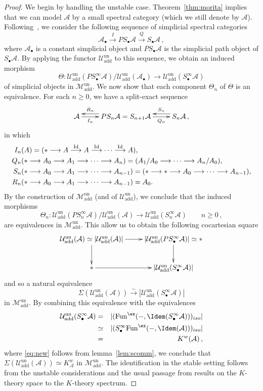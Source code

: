 \documentclass{amsart}
\newcommand{\ssdot}{\bullet}%
\newcommand{\subdot}{_\ssdot}
\newcommand{\Sdot}[1][\ssdot]{S_{#1}}
\newcommand{\iSdot}[1][\ssdot]{S^{\infty}_{#1}}
\renewcommand{\to}{\mathchoice{\longrightarrow}{\rightarrow}{\rightarrow}{\rightarrow}}
\newcommand{\cA}{{\mathcal A}}
\newcommand{\cM}{{\mathcal M}}
\newcommand{\cU}{{\mathcal U}}
\let\catsymbfont\mathcal
\newcommand{\aA}{{\catsymbfont{A}}}
\newcommand{\idemfun}{\Fun^{\ex}}
\newcommand{\Fun}{\mathrm{Fun}} %
\newcommand{\too}{\longrightarrow}%
\newcommand{\Motaddun}{\cM_{\mathrm{add}}^{\mathrm{un}}}
\newcommand{\Umotun}{\cU_{\mathrm{add}}^{\mathrm{un}}}
\numberwithin{equation}{section}
\theoremstyle{definition}
\begin{document}
\begin{proof}
We begin by handling the unstable case.  Theorem~\ref{thm:morita}
implies that we can model $\cA$ by a small spectral category (which we
still denote by $\cA$).
Following~\cite[3.3]{McCarthy}, we consider the following
sequence of simplicial spectral categories
\[
\cA\subdot \stackrel{I}{\too} P\Sdot\cA \stackrel{Q}{\too} \Sdot\cA \,,
\]
where $\cA\subdot$ is a constant simplicial object and $P\Sdot\cA$ is
the simplicial path object of $\Sdot \cA$. By applying the functor
$\Umotun$ to this sequence, we obtain an induced morphism
\[
\Theta\colon\Umotun(P\iSdot\cA)/\Umotun(\cA\subdot) \too
\Umotun(\iSdot\cA)
\]
of simplicial objects in $\Motaddun$. We now show that each component $\Theta_n$ of $\Theta$ is an equivalence. For each $n \geq 0$, we have a split-exact sequence
\[
\xymatrix{
\cA \ar[r]_-{I_n} & PS_n\cA=S_{n+1}\cA \ar@<-1ex>[l]_-{R_n}
\ar[r]_-{Q_n} & S_n\cA \ar@<-1ex>[l]_-{S_n} \,,
}
\]
in which
\begin{align*}
I_n&(A)=(\ast \to A \stackrel{\mathrm{Id}}{\to} A \stackrel{\mathrm{Id}}{\to}
\cdots \stackrel{\mathrm{Id}}{\to} A),\\
Q_n&(\ast \to A_0 \to A_1 \to \cdots \to A_n)=(A_1/A_0 \to \cdots \to A_n/A_0),\\
S_n&(\ast \to A_0 \to A_1 \to \cdots \to A_{n-1})=(\ast \to \ast \to A_0 \to \cdots \to A_{n-1}),\\
R_n&(\ast \to A_0 \to A_1 \to \cdots \too A_{n-1})=A_0.
\end{align*}
By the construction of $\Motaddun$ (and of $\Umotun$), we conclude
that the induced morphisms 
\[
\Theta_n\colon  \Umotun(P\iSdot[n] \cA)/\Umotun(\cA) \too
\Umotun(\iSdot[n] \cA) \qquad n \geq 0\,,
\]
are equivalences in $\Motaddun$.  This allow us to obtain the
following cocartesian square
\[
\xymatrix{
\Umotun(\cA) \simeq |\Umotun(\cA)| \ar[d] \ar[r]
& |\Umotun(P\iSdot\cA)| \simeq \ast \ar[d] \\
\ast \ar[r] & |\Umotun(\iSdot \cA)|
}
\]
and so a natural equivalence
\[
\Sigma(\Umotun(\cA)) \stackrel{\sim}{\too} |\Umotun(\iSdot \cA)|
\]
in $\Motaddun$.  By combining this equivalence with the equivalences
\begin{eqnarray}
\Umotun(\iSdot \cA) & = &
|(\idemfun(-, \Idem(\iSdot \cA)))_{iso}| \nonumber \\ 
& \simeq & |(\iSdot \idemfun(-, \Idem(\cA)))_{iso}| \label{eq:new} \\
& =& K^w(\cA)\,, \nonumber
\end{eqnarray}
where \eqref{eq:new} follows from lemma~\ref{lem:scomm}, we conclude
that $ \Sigma( \Umotun(\aA)) \simeq K^{w}_\aA$ in $\Motaddun$.
The identification in the stable setting follows from the unstable considerations and the usual passage from results on the $K$-theory space to the $K$-theory spectrum.
\end{proof}
\end{document}
